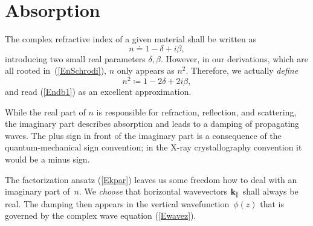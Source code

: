 
\section{Absorption}\label{Sabsorption}

%
The complex refractive index of a given material
shall be written as
\begin{equation}\label{Endb1}
  n\doteq 1-\delta +i\beta,  
\end{equation}
%
%
introducing two small real parameters $\delta, \beta$.
However, 
in our derivations, which are all rooted in~(\ref{EnSchrodi}),
$n$ only appears as $n^2$. 
Therefore, we actually \textit{define}
\begin{equation}\label{Endb2}
  n^2\coloneqq 1-2\delta+2i\beta,
\end{equation}
and read (\ref{Endb1}) as an excellent approximation.

While the real part of $n$ is responsible for refraction, reflection,
and scattering,
the imaginary part describes absorption
and leads to a damping of propagating waves.
The plus sign in front of the imaginary part is a consequence of
the quantum-mechanical sign convention;
in the X-ray crystallography convention it would be a minus sign.
%

The factorization ansatz (\ref{Ekpar}) leaves us some freedom
how to deal with an imaginary part of~$n$.
We \textit{choose} that horizontal wavevectors $\mathbf{k}_\parallel$
shall always be real.
The damping then appears in the vertical wavefunction~$\phi(z)$
that is governed by the complex wave equation (\ref{Ewavez}).
